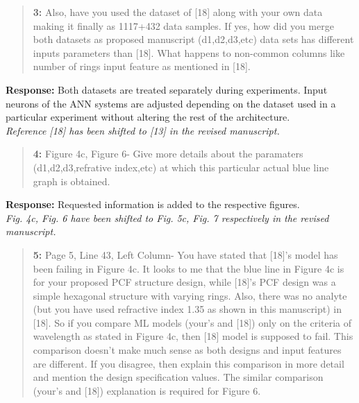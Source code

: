 \documentclass{article}
\begin{document}
	\begin{quote}
		\textbf{3: }Also, have you used the dataset of [18] along with your own data making it finally as 1117+432 data samples. If yes, how did you merge both datasets as proposed manuscript (d1,d2,d3,etc) data sets has different inputs parameters than [18]. What happens to non-common columns like number of rings input feature as mentioned in [18].
	\end{quote}
	
	\textbf{Response: }Both datasets are treated separately during experiments. Input neurons of the ANN systems are adjusted depending on the dataset used in a particular experiment without altering the rest of the architecture.\\
	\textit{Reference [18] has been shifted to [13] in the revised manuscript.}
	
	
	\begin{quote}
		\textbf{4: }Figure 4c, Figure 6- Give more details about the paramaters (d1,d2,d3,refrative index,etc) at which this particular actual blue line graph is obtained.
	\end{quote}
	
	\textbf{Response: } Requested information is added to the respective figures.\\
	\textit{Fig. 4c, Fig. 6 have been shifted to Fig. 5c, Fig. 7 respectively in the revised manuscript.}
	
	
	\begin{quote}
		\textbf{5: }Page 5, Line 43, Left Column- You have stated that [18]'s model has been failing in Figure 4c. It looks to me that the blue line in Figure 4c is for your proposed PCF structure design, while [18]'s PCF design was a simple hexagonal structure with varying rings. Also, there was no analyte (but you have used refractive index 1.35 as shown in this manuscript) in [18]. So if you compare ML models (your's and [18]) only on the criteria of wavelength as stated in Figure 4c, then [18] model is supposed to fail. This comparison doesn't make much sense as both designs and input features are different. If you disagree, then explain this comparison in more detail and mention the design specification values.
		The similar comparison (your's and [18]) explanation is required for Figure 6.
	\end{quote}
	
\end{document}
